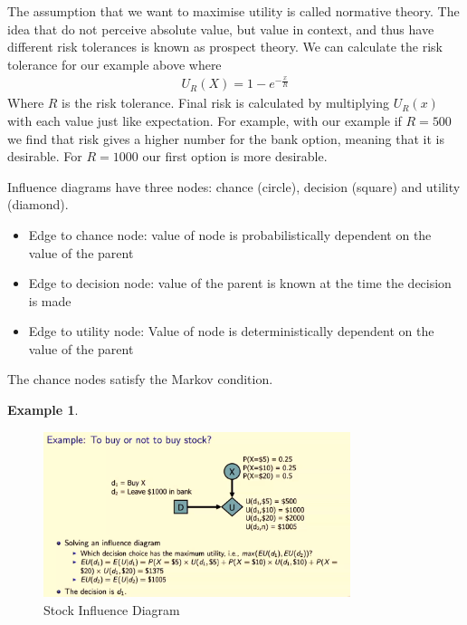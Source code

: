 \documentclass[a4paper]{article}
\theoremstyle{plain}
\theoremstyle{definition}
\newtheorem{defn}{Definition}[section]
\newtheorem{exmp}{Example}[section]
\theoremstyle{remark}
\begin{document}
The assumption that we want to maximise utility is called normative theory. The idea that do not perceive absolute value, but value in context, and thus have different risk tolerances is known as prospect theory. We can calculate the risk tolerance for our example above where
\begin{align*}
	U_R(X) = 1-e^{-\frac{x}{R}}
\end{align*}
Where $R$ is the risk tolerance. Final risk is calculated by multiplying $U_R(x)$ with each value just like expectation. For example, with our example if $R=500$ we find that risk gives a higher number for the bank option, meaning that it is desirable. For $R=1000$ our first option is more desirable. \\
\begin{tcolorbox}[colback=black!3!white,colframe=black!60!white,title=\begin{defn}Influence Diagram \label{Influence Diagram}\end{defn}]
Influence diagrams have three nodes: chance (circle), decision (square) and utility (diamond). \\
\begin{itemize}
	\item Edge to chance node: value of node is probabilistically dependent on the value of the parent
	\item Edge to decision node: value of the parent is known at the time the decision is made
	\item Edge to utility node: Value of node is deterministically dependent on the value of the parent
\end{itemize}
The chance nodes satisfy the Markov condition.
\end{tcolorbox}
\begin{exmp}

\end{exmp}
	\begin{figure}[H]
		\centering
		\includegraphics[width=0.8\textwidth]{stt.png}
		\caption{Stock Influence Diagram}
		\label{fig:stt-png}
	\end{figure}
\end{document}
